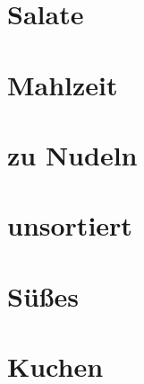 \documentclass{scrartcl}
\begin{document}
\newpage
{\vspace*{4cm}\section{Salate}}


\newpage
{\vspace*{4cm}\section{Mahlzeit}}









\newpage
{\vspace*{4cm}\section{zu Nudeln}}






\newpage
{\vspace*{4cm}\section{unsortiert}}





\newpage
{\vspace*{4cm}\section{Süßes}}






\newpage
{\vspace*{4cm}\section{Kuchen}}









\end{document}
